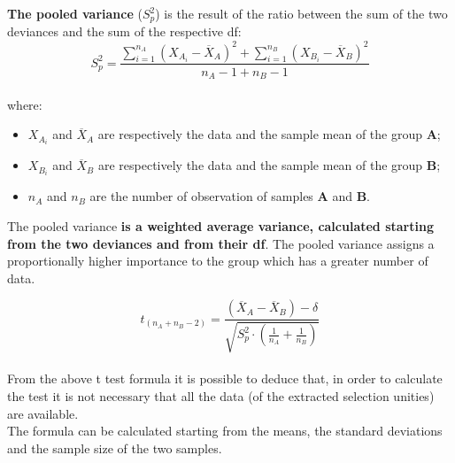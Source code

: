 \begin{frame}
  \begin{small}
    \textbf{The pooled variance} ({\boldmath$ S^2_p $}) is the result of the ratio between the sum of the two deviances and the sum of the respective df:\\
    \vspace*{.25cm}
    $$ S^2_p = \frac{\sum_{i=1}^{n_A}{(X_{A_i}-\overline{X}_A)^2}+\sum_{i=1}^{n_B}{(X_{B_i}-\overline{X}_B)^2}}{n_A-1+n_B-1} $$\\
    \vspace*{.25cm}
    where:
    \begin{itemize}
      \item $ X_{A_i} $ and $ \overline{X}_A $ are respectively the data and the sample mean of the group \textbf{A};
      \item $ X_{B_i} $ and $ \overline{X}_B $ are respectively the data and the sample mean of the group \textbf{B};
      \item $ n_A $ and $ n_B $ are the number of observation of samples \textbf{A} and \textbf{B}.
    \end{itemize}
    \vspace*{.25cm}
    The pooled variance \textbf{is a weighted average variance, calculated starting from the two deviances and from their df}. The pooled variance assigns a proportionally higher importance to the group which has a greater number of data.
  \end{small}
\end{frame}

\begin{frame}
  \vspace*{.25cm}
  $$ t_{(n_A+n_B-2)} = \frac{(\overline{X}_A-\overline{X}_B)-\delta}{\sqrt{S^2_p \cdot (\frac{1}{n_A}+\frac{1}{n_B})}} $$\\
  \vspace*{.25cm}
  From the above t test formula it is possible to deduce that, in order to calculate the test it is not necessary that all the data (of the extracted selection unities) are available.\\
  \vspace*{.5cm}
  The formula can be calculated starting from the means, the standard deviations and the sample size of the two samples.
\end{frame}





